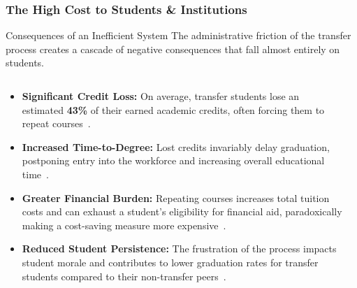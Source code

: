 \documentclass[aspectratio=169,10pt]{beamer}
\begin{document}
\begin{frame}
    \frametitle{The High Cost to Students \& Institutions}
    
    \begin{alertblock}{Consequences of an Inefficient System}
        The administrative friction of the transfer process creates a cascade of negative consequences that fall almost entirely on students.
    \end{alertblock}
    
    \begin{columns}[T]
        \begin{column}{0.6\textwidth}
            \begin{itemize}
                \item \textbf{Significant Credit Loss:} On average, transfer students lose an estimated \textbf{43\%} of their earned academic credits, often forcing them to repeat courses~\cite{gao2017, publicagenda2025}.
                
                \item \textbf{Increased Time-to-Degree:} Lost credits invariably delay graduation, postponing entry into the workforce and increasing overall educational time~\cite{gao2017}.
                
                \item \textbf{Greater Financial Burden:} Repeating courses increases total tuition costs and can exhaust a student's eligibility for financial aid, paradoxically making a cost-saving measure more expensive~\cite{gao2017, collegeopportunity2017}.
                
                \item \textbf{Reduced Student Persistence:} The frustration of the process impacts student morale and contributes to lower graduation rates for transfer students compared to their non-transfer peers~\cite{porter1999}.
            \end{itemize}
        \end{column}
        
        \begin{column}{0.4\textwidth}
            

\end{column}
\end{columns}
\end{frame}
\end{document}
